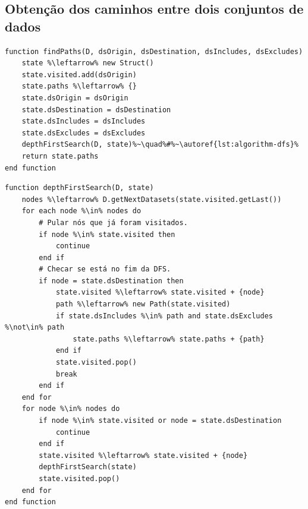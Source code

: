 
\subsection{Obtenção dos caminhos entre dois conjuntos de dados}


\begin{minipage}[c]{0.95\textwidth}
\begin{lstlisting}[language=pseudocode,label={lst:algorithm-find-paths},caption={[Obtenção dos caminhos entre dois conjuntos de dados.]Obtenção dos caminhos entre dois conjuntos de dados, inicializando a \textsc{DFS} com um estado inicial apropriado.}]
function findPaths(D, dsOrigin, dsDestination, dsIncludes, dsExcludes)
    state %\leftarrow% new Struct()
    state.visited.add(dsOrigin)
    state.paths %\leftarrow% {}
    state.dsOrigin = dsOrigin
    state.dsDestination = dsDestination
    state.dsIncludes = dsIncludes
    state.dsExcludes = dsExcludes
    depthFirstSearch(D, state)%~\quad%#%~\autoref{lst:algorithm-dfs}%
    return state.paths
end function
\end{lstlisting}
\end{minipage}

\begin{minipage}[c]{0.95\textwidth}
\begin{lstlisting}[language=pseudocode,label={lst:algorithm-dfs},caption={[Depth First Search (DFS)]Depth First Search (DFS): busca em profundidade dos caminhos entre dois conjuntos de dados.}]
function depthFirstSearch(D, state)
    nodes %\leftarrow% D.getNextDatasets(state.visited.getLast())
    for each node %\in% nodes do
        # Pular nós que já foram visitados.
        if node %\in% state.visited then
            continue
        end if
        # Checar se está no fim da DFS.
        if node = state.dsDestination then
            state.visited %\leftarrow% state.visited + {node}
            path %\leftarrow% new Path(state.visited)
            if state.dsIncludes %\in% path and state.dsExcludes %\not\in% path
                state.paths %\leftarrow% state.paths + {path}
            end if
            state.visited.pop()
            break
        end if
    end for
    for node %\in% nodes do
        if node %\in% state.visited or node = state.dsDestination
            continue
        end if
        state.visited %\leftarrow% state.visited + {node}
        depthFirstSearch(state)
        state.visited.pop()
    end for
end function
\end{lstlisting}
\end{minipage}

